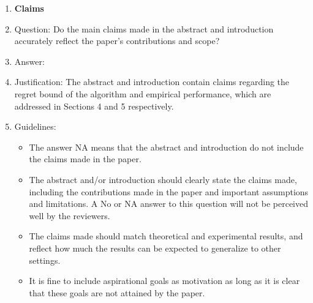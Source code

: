\documentclass{article}
\theoremstyle{plain}
\theoremstyle{definition}
\theoremstyle{remark}
\theoremstyle{plain}
\begin{document}

 



\begin{enumerate}

\item {\bf Claims}
    \item[] Question: Do the main claims made in the abstract and introduction accurately reflect the paper's contributions and scope?
    \item[] Answer: \answerYes{} %
    \item[] Justification: The abstract and introduction contain claims regarding the regret bound of the algorithm and empirical performance, which are addressed in Sections 4 and 5 respectively.
    \item[] Guidelines:
    \begin{itemize}
        \item The answer NA means that the abstract and introduction do not include the claims made in the paper.
        \item The abstract and/or introduction should clearly state the claims made, including the contributions made in the paper and important assumptions and limitations. A No or NA answer to this question will not be perceived well by the reviewers. 
        \item The claims made should match theoretical and experimental results, and reflect how much the results can be expected to generalize to other settings. 
        \item It is fine to include aspirational goals as motivation as long as it is clear that these goals are not attained by the paper. 
    \end{itemize}


\end{enumerate}
\end{document}
